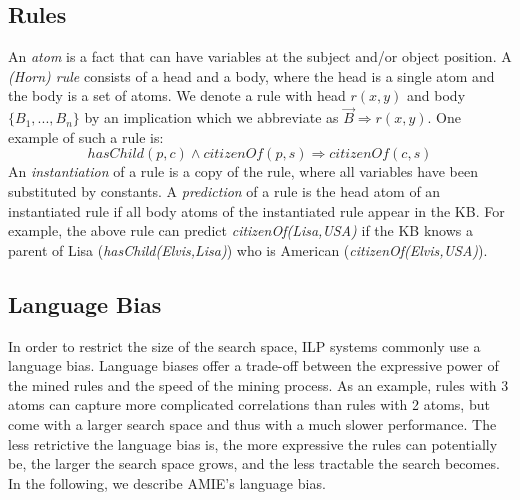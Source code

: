 \subsection{Rules}
An \emph{atom} is a fact that can have variables at the subject and/or object position.
A \emph{(Horn) rule} consists of a head and a body, where the head is a single atom and the body is a set of atoms.
We denote a rule with head $r(x,y)$ and body $\{B_1,..., B_n\}$ by an implication
which we abbreviate as $\vec{B} \Rightarrow r(x,y)$. One example of such a rule is:
\[ hasChild(p,c) \wedge citizenOf(p,s) \Rightarrow citizenOf(c,s) \]
An \emph{instantiation} of a rule is a copy of the rule, where all variables have been substituted by constants.
A \emph{prediction} of a rule is the head atom of an instantiated rule if all body atoms of the instantiated rule appear in the KB.
For example, the above rule can predict \emph{citizenOf(Lisa,USA)} if the KB knows a parent of Lisa (\emph{hasChild(Elvis,Lisa)}) who is American (\emph{citizenOf(Elvis,USA)}).


\subsection{Language Bias}

In order to restrict the size of the search space, ILP systems commonly use a language bias.
Language biases offer a trade-off between the expressive power of the mined rules and the speed of the mining process.
As an example, rules with 3 atoms can capture more complicated correlations than rules with 2 atoms, but come with a larger search space and thus with a much slower performance.
The less retrictive the language bias is,
the more expressive the rules can potentially be, the larger the search space grows, and the less tractable the search becomes.
In the following, we describe AMIE's language bias.

